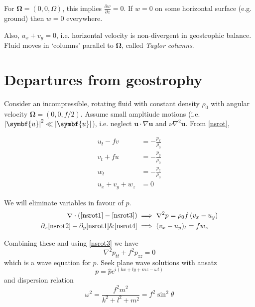 \documentclass{jknotes}
\begin{document}
For $\symbf{\Omega} = (0, 0, \Omega)$, this implies $\frac{\partial w}{\partial
z} = 0$. If $w = 0$ on some horizontal surface (e.g. ground) then $w=0$
everywhere. 

Also, $u_x + v_y = 0$, i.e. horizontal velocity is non-divergent in
geostrophic balance. Fluid moves in `columns' parallel to $\symbf{\Omega}$,
called \emph{Taylor columns}.

\section{Departures from geostrophy}
Consider an incompressible, rotating fluid with constant density $\rho_0$ with
angular velocity $\symbf{\Omega} = (0, 0, f/2)$. Assume small ampltiude motions
(i.e. $\abs{\symbf{u}}^2 \ll \abs{\symbf{u}}$), i.e. neglect $\symbf{u}\cdot \nabla
\symbf{u}$ and $\nu \nabla^2 \symbf{u}$. From \eqref{nsrot},

\begin{align}
	u_t - fv &= -\frac{p_x}{\rho_0} \label{nsrot1} \\
	v_t + fu &= -\frac{p_y}{\rho_0} \label{nsrot2}\\
	w_t &= -\frac{p_z}{\rho_0} \label{nsrot3}\\
	u_x + v_y + w_z &= 0 \label{nsrot4}
\end{align}

We will eliminate variables in favour of $p$.
\begin{equation}
	\begin{aligned}
		\nabla \cdot \left( \eqref{nsrot1} - \eqref{nsrot3}\right) &\implies
\nabla^2 p = \rho_0 f\left(v_x - u_y\right) \\
\partial_x \eqref{nsrot2} - \partial_y \eqref{nsrot1} \& \eqref{nsrot4}
&\implies (v_x-u_y)_t = fw_z \\
\end{aligned}
\end{equation}

Combining these and using \eqref{nsrot3} we have
\begin{equation}
	\nabla^2 p_{tt} + f^2 p_{zz} = 0
\end{equation}
which is a wave equation for $p$. Seek plane wave solutions with ansatz 
\begin{equation}
	p = \hat{p}e^{i\left(kx + ly + mz-\omega t\right)}
\end{equation}
and dispersion relation
\begin{equation}
	\omega^2 = \frac{f^2 m^2}{k^2+l^2+m^2} = f^2 \sin^2 \theta
\end{equation}
\end{document}
